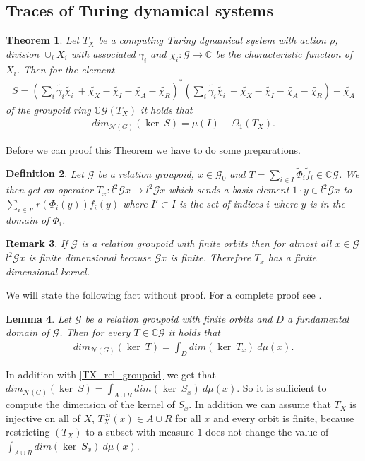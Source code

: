 \documentclass[12pt,a4paper]{scrartcl}
\newtheorem{Theorem}{Theorem}[section]
\newtheorem{Definition}[Theorem]{Definition}
\newtheorem{Lemma}[Theorem]{Lemma}
\newtheorem{Remark}[Theorem]{Remark}
\numberwithin{equation}{section}
\newcommand{\C}{\mathbb{C}} %
\newcommand{\2}{\mathbb{Z} / 2 \mathbb{Z}}
\newcommand{\G}{\mathcal{G}}
\newcommand{\1}{\bar{1}}
\newcommand{\0}{\bar{0}}
\begin{document}
\subsection{Traces of Turing dynamical systems}
\begin{Theorem} \label{groserSatz}
	Let $T_X$ be a computing Turing dynamical system with action $\rho$, division $\cup_i X_i$ with associated $\gamma_i$ and $\chi_i : \G \to \C$ be the characteristic function of $X_i$. Then for the element
	\begin{align*}
		S = (\sum_{i} \tilde{\bar{\gamma_i}} \tilde{\chi_i} \ + \tilde{\chi_X} - \tilde{\chi_I} - \tilde{\chi_A} - \tilde{\chi_R})^*(\sum_{i} \tilde{\bar{\gamma_i}} \tilde{\chi_i} \ + \tilde{\chi_X} - \tilde{\chi_I} - \tilde{\chi_A} - \tilde{\chi_R}) + \tilde{\chi_A}
	\end{align*}
	of the groupoid ring $\C \G(T_X)$ it holds that
	\begin{align*}
		dim_{\mathcal{N}(G)}(\ker \ S) = \mu(I) - \Omega_1(T_X).
	\end{align*}
\end{Theorem}
Before we can proof this Theorem we have to do some preparations. 
\begin{Definition}
	Let $\G$ be a relation groupoid, $x \in \G_0$ and $T = \sum_{i \in I} \tilde \Phi_i\tilde f_i \in \C\G$. We then get an operator $T_x: l^2\G x \to l^2\G x$ which sends a basis element $1 \cdot y \in l^2\G x$ to $\sum_{i \in I'} r(\Phi_i(y)) f_i(y)$ where $I' \subset I$ is the set of indices $i$ where $y$ is in the domain of $\Phi_i$. 
\end{Definition}
\begin{Remark}
	If $\G$ is a relation groupoid with finite orbits then for almost all $x \in \G$ $l^2\G x$ is finite dimensional because $\G x$ is finite. Therefore $T_x$ has a finite dimensional kernel.
\end{Remark}
We will state the following fact without proof. For a complete proof see \cite{GRAB}.
\begin{Lemma}
	Let $\G$ be a relation groupoid with finite orbits and $D$ a fundamental domain of $\G$. Then for every $T \in \C \G$ it holds that
	\begin{align*}
		dim_{\mathcal{N}(G)}(\ker \ T) = \int_D dim (\ker \ T_x) \ d \mu (x).
	\end{align*} 
\end{Lemma}
In addition with \ref{TX_rel_groupoid} we get that $dim_{\mathcal{N}(G)}(\ker \ S) = \int_{A \cup R} dim (\ker \ S_x) \ d \mu (x)$. So it is sufficient to compute the dimension of the kernel of $S_x$. In addition we can assume that $T_X$ is injective on all of $X$, $T_X^\infty(x) \in A \cup R$ for all $x$ and every orbit is finite, because restricting $(T_X)$ to a subset with measure $1$ does not change the value of $\int_{A \cup R} dim (\ker \ S_x) \ d \mu (x)$. 
\end{document}
